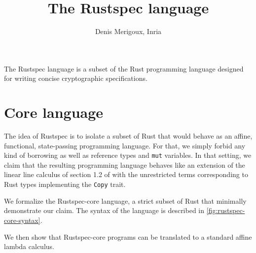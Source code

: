 \documentclass[10pt, english, a4paper]{article}
\title{The Rustspec language}
\author{Denis Merigoux, Inria}
\newcommand{\rust}[1]{\texttt{#1}}
\begin{document}
\maketitle

The Rustspec language is a subset of the Rust programming language designed
for writing concise cryptographic specifications.

\section{Core language}

The idea of Rustspec is to isolate a subset of Rust that would behave as an affine,
functional, state-passing programming language. For that, we simply forbid
any kind of borrowing as well as reference types and \rust{mut} variables.
In that setting, we claim that the resulting programming language behaves
like  an extension of the linear line calculus of section 1.2 of \cite{pierce2005advanced}
with the unrestricted terms corresponding to Rust types implementing the \rust{Copy}
trait.

We formalize the Rustspec-core language, a strict subset
of Rust that minimally demonstrate our claim. The syntax of the language is
described in \autoref{fig:rustspec-core-syntax}.

We then show that Rustspec-core programs can be translated to a standard
affine lambda calculus.
\end{document}
